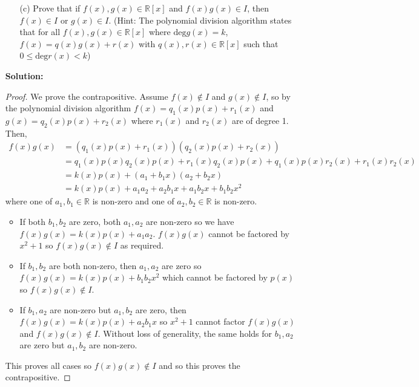 \documentclass[letterpaper,12pt]{article}
\theoremstyle{definition}
\begin{document}
\begin{enumerate}
    \item[] \begin{enumerate}
        \item[(c)]Prove that if $f(x),g(x) \in \mathbb{R}[x]$ and $f(x)g(x) \in I$, then $f(x) \in I$ or $g(x) \in I$. (Hint: The polynomial division algorithm states that for all $f(x),g(x) \in \mathbb{R}[x]$ where $\mathrm{deg}g(x) = k$, $f(x)=q(x)g(x)+r(x)$ with $q(x),r(x) \in \mathbb{R}[x]$ such that $0 \leq \mathrm{deg}r(x) < k$)
    \end{enumerate}
    \begin{mdframed}
            \textbf{Solution:}
            \begin{proof}
                We prove the contrapositive. Assume $f(x) \notin I$ and $g(x) \notin I$, so by the polynomial division algorithm $f(x) = q_1(x)p(x) + r_1(x)$ and $g(x) = q_2(x)p(x) + r_2(x)$ where $r_1(x)$ and $r_2(x)$ are of degree 1. Then, \begin{align*}
                    f(x)g(x) &= (q_1(x)p(x) + r_1(x))(q_2(x)p(x) + r_2(x)) \\
                    &= q_1(x)p(x)q_2(x)p(x) + r_1(x)q_2(x)p(x) + q_1(x)p(x)r_2(x) + r_1(x)r_2(x) \\
                    &= k(x)p(x) + (a_1 + b_1x)(a_2 + b_2x) \\
                    &= k(x)p(x) + a_1a_2 + a_2b_1x  + a_1b_2 x + b_1 b_2 x^2 
                \end{align*}
                where one of $a_1,b_1 \in \mathbb{R}$ is non-zero and one of $a_2,b_2 \in \mathbb{R}$ is non-zero. \begin{itemize}
                    \item If both $b_1,b_2$ are zero, both $a_1,a_2$ are non-zero so we have $f(x)g(x) = k(x)p(x) + a_1a_2$. $f(x)g(x)$ cannot be factored by $x^2 + 1$ so $f(x)g(x) \notin I$ as required.
                    \item If $b_1,b_2$ are both non-zero, then $a_1,a_2$ are zero so $f(x)g(x) = k(x)p(x) + b_1 b_2 x^2$ which cannot be factored by $p(x)$ so $f(x)g(x) \notin I$.
                    \item If $b_1,a_2$ are non-zero but $a_1,b_2$ are zero, then $f(x)g(x) = k(x)p(x) + a_2b_1 x$ so $x^2+1$ cannot factor $f(x)g(x)$ and $f(x)g(x) \notin I$. Without loss of generality, the same holds for $b_1,a_2$ are zero but $a_1,b_2$ are non-zero.
                \end{itemize}
                This proves all cases so $f(x)g(x) \notin I$ and so this proves the contrapositive.
            \end{proof}
        \end{mdframed}
\end{enumerate}
\end{document}
